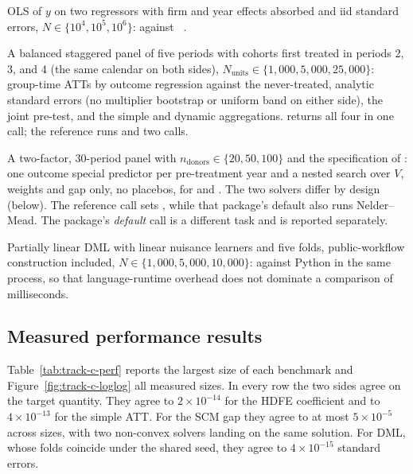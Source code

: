 \begin{description}[leftmargin=1.25em,itemsep=0.2em]
\item[HDFE.] OLS of \(y\) on two regressors with firm and year effects
absorbed and iid standard errors, \(N \in \{10^4,10^5,10^6\}\):
 against ~\citep{berge2018efficient}.
\item[CS-DiD.] A balanced staggered panel of five periods with cohorts
first treated in periods 2, 3, and 4 (the same calendar on both sides),
\(N_{\mathrm{units}} \in \{1{,}000,5{,}000,25{,}000\}\): group-time ATTs
by outcome regression against the never-treated, analytic standard
errors (no multiplier bootstrap or uniform band on either side), the
joint pre-test, and the simple and dynamic aggregations.
 returns all four in one call; the reference
runs  and two  calls.
\item[SCM.] A two-factor, 30-period panel with
\(n_{\mathrm{donors}} \in \{20,50,100\}\) and the specification of
\citet{abadie2010synthetic}: one outcome special predictor per
pre-treatment year and a nested search over \(V\), weights and gap only,
no placebos, for  and
. The two solvers differ by design (below). The reference
call sets , while that package's default also runs
Nelder--Mead. The package's \emph{default} call is a different task and is
reported separately.
\item[DML.] Partially linear DML with linear nuisance learners and five
folds, public-workflow construction included, \(N \in
\{1{,}000,5{,}000,10{,}000\}\):  against
 Python in the same process, so that language-runtime
overhead does not dominate a comparison of milliseconds.
\end{description}

\subsection{Measured performance results}

Table~\ref{tab:track-c-perf} reports the largest size of each benchmark
and Figure~\ref{fig:track-c-loglog} all measured sizes. In every row the
two sides agree on the target quantity. They agree to \(2\times10^{-14}\)
for the HDFE coefficient and to \(4\times10^{-13}\) for the simple ATT.
For the SCM gap they agree to at most \(5\times10^{-5}\) across sizes, with two non-convex
solvers landing on the same solution. For DML, whose folds coincide under
the shared seed, they agree to \(4\times10^{-15}\) standard errors.

